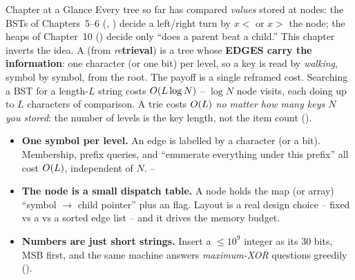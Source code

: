 
\begin{chaptertheorybox}{Chapter at a Glance}
Every tree so far has compared \emph{values} stored at nodes: the BSTs of Chapters~5--6
(, ) decide a left/right turn by $x<$ or $x>$ the node; the heaps of
Chapter~10 () decide only ``does a parent beat a child.'' This chapter inverts the idea.
A  (from \emph{re}\textbf{trie}\textbf{val}) is a tree whose \textbf{EDGES carry the
information}: one character (or one bit) per level, so a key is read by \emph{walking}, symbol by
symbol, from the root. The payoff is a single reframed cost. Searching a BST for a length-$L$ string
costs $O(L\log N)$ -- $\log N$ node visits, each doing up to $L$ characters of comparison. A trie
costs $O(L)$ \emph{no matter how many keys $N$ you stored}: the number of levels is the key length,
not the item count ().
\begin{itemize}[nosep]
  \item \textbf{One symbol per level.} An edge is labelled by a character (or a bit). Membership,
        prefix queries, and ``enumerate everything under this prefix'' all cost $O(L)$, independent
        of $N$. \hfill {}--
  \item \textbf{The node is a small dispatch table.} A node holds the map (or array) ``symbol $\to$
        child pointer'' plus an  flag. Layout is a real design choice -- fixed
         vs a  vs a sorted edge list -- and it drives the memory budget.
        \hfill {}
  \item \textbf{Numbers are just short strings.} Insert a $\le\!10^9$ integer as its $30$ bits, MSB
        first, and the same machine answers \emph{maximum-XOR} questions greedily ().
        \hfill {}
\end{itemize}


\end{chaptertheorybox}
